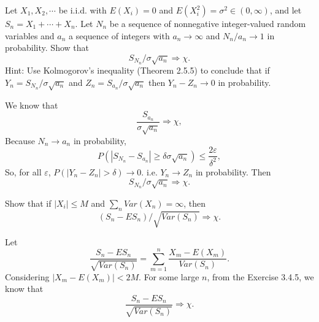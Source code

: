 \documentclass[en, normal, 12pt, black]{elegantnote}
\newenvironment{exercise}[1]{\begin{tcolorbox}[colback=black!15, colframe=black!80, breakable, title=#1]}{\end{tcolorbox}}
\newenvironment{solution}{\begin{tcolorbox}[colback=white, colframe=black!50, breakable, title=Solution. ]\setlength{\parskip}{0.8em}}{\end{tcolorbox}}
\begin{document}
    \begin{exercise}{3.4.6 Random index central limit theorem. }
        Let $X_1, X_2, \cdots$ be i.i.d. with $E(X_i) = 0$ and $E(X_i^2) = \sigma^2 \in (0,\infty)$, and let $S_n = X_1 + \cdots + X_n$. Let $N_n$ be a sequence of nonnegative integer-valued random variables and $a_n$ a sequence of integers with $a_n\to\infty$ and $N_n/a_n \to 1$ in probability. Show that
        \[
            S_{N_n}/\sigma\sqrt{a_n}\Rightarrow\chi. 
        \]
        Hint: Use Kolmogorov's inequality (Theorem 2.5.5) to conclude that if $Y_n = S_{N_n}/\sigma\sqrt{a_n}$ and $Z_n = S_{a_n}/\sigma\sqrt{a_n}$ then $Y_n-Z_n \to 0$ in probability. 
    \end{exercise}

    \begin{solution}
        We know that
        \[
            \frac{S_{a_n}}{\sigma\sqrt{a_n}}\Rightarrow\chi, 
        \]
        Because $N_n\to a_n$ in probability, 
        \[
            P(|S_{N_n}-S_{a_n}|\geqslant\delta\sigma\sqrt{a_n})\leqslant\frac{2\varepsilon}{\delta^2}, 
        \]
        So, for all $\varepsilon$, $P(|Y_n-Z_n|>\delta)\to 0$. i.e. $Y_n\to Z_n$ in probability. Then
        \[
            S_{N_n}/\sigma\sqrt{a_n}\Rightarrow\chi. 
        \]
    \end{solution}


    \begin{exercise}{3.4.10}
        Show that if $\left|X_{i}\right| \leqslant M$ and $\sum_{n} Var\left(X_{n}\right)=\infty$, then
        \[
            \left(S_{n}-E S_{n}\right) / \sqrt{Var\left(S_{n}\right)} \Rightarrow \chi. 
        \]
    \end{exercise}

    \begin{solution}
        Let
        \[\frac{S_n-ES_n}{\sqrt{Var(S_n)}} = \sum_{m=1}^n\frac{X_m - E(X_m)}{Var(S_n)}. \]
        Considering $|X_m-E(X_m)|<2M$. For some large $n$, from the Exercise 3.4.5, we know that 
        \[
            \frac{S_n-ES_n}{\sqrt{Var(S_n)}} \Rightarrow \chi. 
        \]
    \end{solution}
\end{document}
